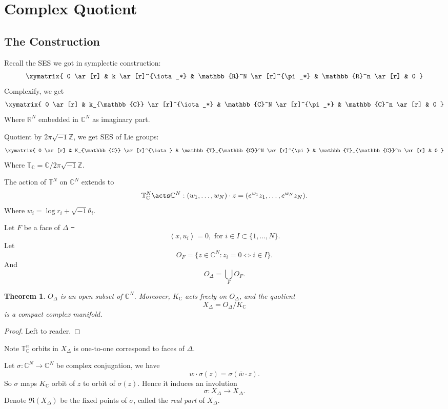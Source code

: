 \documentclass[12pt]{article}
\theoremstyle{plain}\newtheorem{theorem}{Theorem}
\theoremstyle{definition}\newtheorem{definition}[theorem]{Definition}
\theoremstyle{definition}\newtheorem{example}[theorem]{Example}
\theoremstyle{plain}\newtheorem{axiom}[theorem]{Axiom}
\theoremstyle{plain}\newtheorem{assertion}[theorem]{Assertion}
\theoremstyle{plain}\newtheorem{corollary}[theorem]{Corollary}
\theoremstyle{plain}\newtheorem{lemma}[theorem]{Lemma}
\theoremstyle{plain}\newtheorem{proposition}[theorem]{Proposition}
\theoremstyle{plain}\newtheorem{prop}[theorem]{Proposition}
\theoremstyle{plain}\newtheorem{conjecture}[theorem]{Conjecture}
\theoremstyle{plain}\newtheorem{conj}[theorem]{Conjecture}
\theoremstyle{plain}\newtheorem{problem}[theorem]{Problem}
\theoremstyle{remark}\newtheorem{notation}[theorem]{Notation}
\theoremstyle{definition}\newtheorem*{question}{Question}
\theoremstyle{definition}\newtheorem*{answer}{Answer}
\theoremstyle{definition}\newtheorem*{goal}{Goal}
\theoremstyle{plain}\newtheorem*{application}{Application}
\theoremstyle{plain}\newtheorem*{exercise}{Exercise}
\theoremstyle{remark}\newtheorem*{remark}{Remark}
\theoremstyle{remark}\newtheorem*{note}{\small{Note}}
\numberwithin{equation}{section}
\numberwithin{theorem}{section}
\numberwithin{figure}{section}
\begin{document}
\section{Complex Quotient}
\subsection{The Construction}
Recall the SES we got in symplectic construction: \[
\xymatrix{
    0 \ar[r] & k \ar[r]^{\iota_*} & \mathbb{R}^N \ar[r]^{\pi_*} & \mathbb{R}^n \ar[r] & 0
}\] Complexify, we get \[
\xymatrix{
    0 \ar[r] & k_{\mathbb{C}} \ar[r]^{\iota_*} & \mathbb{C}^N \ar[r]^{\pi_*} &
    \mathbb{C}^n \ar[r] & 0
}\] 
Where \(\mathbb{R}^N\) embedded in \(\mathbb{C}^N\) as imaginary part.

Quotient by \(2\pi\sqrt{-1}\mathbb{Z}\), we get SES of Lie groups: \[
\xymatrix{
    0 \ar[r] & K_{\mathbb{C}} \ar[r]^{\iota} & \mathbb{T}_{\mathbb{C}}^N
    \ar[r]^{\pi} & \mathbb{T}_{\mathbb{C}}^n \ar[r] & 0
}\] Where \(\mathbb{T}_{\mathbb{C}}=\mathbb{C}/2\pi\sqrt{-1}\mathbb{Z}\).

The action of \(\mathbb{T}^N\) on \(\mathbb{C}^N\) extends to \[
    \mathbb{T}_{\mathbb{C}}^N\acts \mathbb{C}^N:
    (w_1,\ldots,w_N)\cdot z=(e^{w_1}z_1,\ldots,e^{w_N}z_N)
.\] Where \(w_i=\log r_i +\sqrt{-1}\theta_i\).

Let \(F\) be a face of \(\Delta\) \st\ \[
    \left<x,u_i\right> =0,\text{ for }i\in I\subset \{1,\ldots,N\}
.\] Let  \[
    O_F=\{z\in \mathbb{C}^N:z_i=0\iff i\in I\}
.\] And \[
    O_{\Delta}=\bigcup_{F}O_F
.\] 
\begin{theorem}
    \(O_{\Delta}\) is an open subset of \(\mathbb{C}^N\). Moreover, \(K_{\mathbb{C}}\)
    acts freely on \(O_\Delta\), and the quotient \[
        X_{\Delta}=O_\Delta/K_{\mathbb{C}}
    \] is a compact complex manifold.
\end{theorem}
\begin{proof}
    Left to reader.
\end{proof}
Note \(\mathbb{T}_{\mathbb{C}}^n\) orbits in \(X_{\Delta}\) is one-to-one correspond
to faces of \(\Delta\).

Let \(\sigma\colon \mathbb{C}^N\to \mathbb{C}^N\) be complex conjugation, we have \[
    w\cdot \sigma(z)=\sigma(\overline{w}\cdot z)
.\] So \(\sigma\) maps \(K_{\mathbb{C}}\) orbit of \(z\) to orbit of \(\sigma(z)\).
Hence it induces an involution \[
    \sigma\colon X_\Delta\to X_\Delta
.\] Denote \(\Re(X_{\Delta})\) be the fixed points of \(\sigma\), called the \emph{real
part} of \(X_\Delta\).
\end{document}
